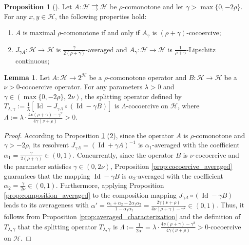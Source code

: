 \documentclass{article}
\theoremstyle{definition}
\newtheorem{lemma}{Lemma}[section]
\newtheorem{proposition}{Proposition}[section]
\theoremstyle{definition}
\theoremstyle{definition}
\begin{document}
\begin{proposition} [\cite{tan2023second}] \label{prop:max_comonotone_properties}
Let $A: \mathcal{H} \rightrightarrows \mathcal{H}$ be $\rho$-comonotone and let $\gamma > \max\{0, -2\rho\}$. For any $x, y \in \mathcal{H}$, the following properties hold:
\begin{enumerate}
    \item[\rm (1)] $A$ is maximal $\rho$-comonotone if and only if $A_\gamma$ is $\left( \rho + \gamma \right)$-cocoercive;
    \item[\rm (2)] $J_{\gamma A} : \mathcal{H} \to \mathcal{H}$ is $\frac{\gamma}{2(\rho + \gamma)}$-averaged and $A_\gamma : \mathcal{H} \to \mathcal{H}$ is $\frac{1}{\rho + \gamma}$-Lipschitz continuous;
\end{enumerate}
\end{proposition}

\begin{lemma}
\label{thm:coco_T_final}
Let $A: \mathcal{H} \to 2^{\mathcal{H}}$ be a $\rho$-comonotone operator and $B: \mathcal{H} \to \mathcal{H}$ be a $\nu>0$-cocoercive operator. For any parameters $\lambda > 0$ and $\gamma \in \left( \max\{0, -2\rho\}, \, 2\nu \right)$, the splitting operator defined by $T_{\lambda, \gamma} := \frac{1}{\lambda} \left[ \operatorname{Id} - J_{\gamma A} \circ \left( \operatorname{Id} - \gamma B \right) \right]$ is $\Lambda$-cocoercive on $\mathcal{H}$, where $\Lambda := \lambda \cdot \frac{4\nu \left( \rho + \gamma \right) - \gamma^2}{4\gamma \left( \nu + \rho \right)}>0$.
\end{lemma}

\begin{proof}
According to Proposition \ref{prop:max_comonotone_properties} (2), since the operator $A$ is $\rho$-comonotone and $\gamma > -2\rho$, its resolvent $J_{\gamma A} = (\operatorname{Id} + \gamma A)^{-1}$ is $\alpha_1$-averaged with the coefficient $\alpha_1 = \frac{\gamma}{2\left( \rho + \gamma \right)} \in(0,1)$.
Concurrently, since the operator $B$ is $\nu$-cocoercive and the parameter satisfies $\gamma \in (0, 2\nu)$, Proposition \ref{prop:cocoercive_averaged} guarantees that the mapping $\operatorname{Id} - \gamma B$ is $\alpha_2$-averaged with the coefficient $\alpha_2 = \frac{\gamma}{2\nu}\in(0,1)$. 
Furthermore, applying Proposition \ref{prop:composition_averaged} to the composition mapping $J_{\gamma A} \circ \left( \operatorname{Id} - \gamma B \right)$ leads to its averageness with $\alpha'= \frac{\alpha_{1} + \alpha_{2} - 2\alpha_{1} \alpha_{2}}{1 - \alpha_{1} \alpha_{2}}=\frac{2\gamma\left( \nu + \rho \right)}{4\nu\left( \rho + \gamma \right) - \gamma^2}\in \left( 0, 1 \right)$. Thus, it follows from Proposition \ref{prop:averaged_characterization} and the definition of $T_{\lambda, \gamma}$ that the splitting operator $T_{\lambda, \gamma}$ is $\Lambda :=\frac{1}{2\alpha^{\prime}}= \lambda \cdot \frac{4\nu \left( \rho + \gamma \right) - \gamma^2}{4\gamma \left( \nu + \rho \right)}>0$-cocoercive on $\mathcal{H}$.
\end{proof}
\end{document}
